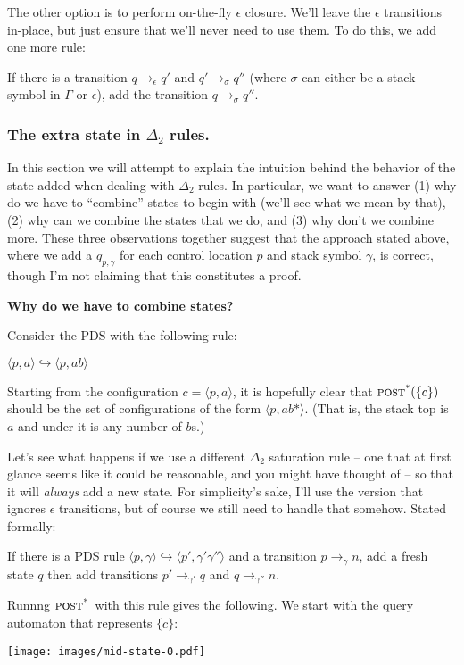 \documentclass{article}
\newcommand{\Config}[2]{\ensuremath{\langle #1, #2 \rangle}}
\newcommand{\Rule}[2]{\ensuremath{#1 \hookrightarrow #2}}
\newcommand{\Trans}[3]{\ensuremath{#1 \rightarrow_{#2} #3}}
\newcommand{\subsubsubsection}[1]{\textbf{#1}}
\newcommand{\poststar}{\ensuremath{\textsc{post}^\textsc{*}}}
\begin{document}
The other option is to perform on-the-fly $\epsilon$ closure. We'll
leave the $\epsilon$ transitions in-place, but just ensure that we'll
never need to use them. To do this, we add one more rule:

    If there is a transition \Trans{q}{\epsilon}{q'} and
    \Trans{q'}{\sigma}{q''} (where $\sigma$ can either be a stack
    symbol in $\Gamma$ or $\epsilon$), add the transition
    \Trans{q}{\sigma}{q''}.


\subsubsection{The extra state in $\Delta_2$ rules.}

In this section we will attempt to explain the intuition behind the
behavior of the state added when dealing with $\Delta_2$ rules.  In
particular, we want to answer (1) why do we have to ``combine'' states
to begin with (we'll see what we mean by that), (2) why can we combine
the states that we do, and (3) why don't we combine more. These three
observations together suggest that the approach stated above, where we
add a $q_{p,\gamma}$ for each control location $p$ and stack symbol
$\gamma$, is correct, though I'm not claiming that this constitutes a
proof.

\subsubsubsection{Why do we have to combine states?}

Consider the PDS with the following rule:

  \Rule{\Config{p}{a}}{\Config{p}{ab}}

Starting from the configuration $c = \Config{p}{a}$, it is hopefully
clear that $\poststar(\{c\})$ should be the set of configurations of
the form \Config{p}{ab*}. (That is, the stack top is $a$ and under it
is any number of $b$s.)

Let's see what happens if we use a different $\Delta_2$ saturation
rule -- one that at first glance seems like it could be reasonable,
and you might have thought of -- so that it will \emph{always} add a
new state. For simplicity's sake, I'll use the version that ignores
$\epsilon$ transitions, but of course we still need to handle that
somehow. Stated formally:

   If there is a PDS rule
   \Rule{\Config{p}{\gamma}}{\Config{p'}{\gamma'\gamma''}} and a
   transition \Trans{p}{\gamma}{n}, add a fresh state $q$ then add
   transitions \Trans{p'}{\gamma'}{q} and \Trans{q}{\gamma''}{n}.

Runnng \poststar\ with this rule gives the following. We start with the
query automaton that represents $\{c\}$:
\begin{center}
  \texttt{[image: images/mid-state-0.pdf]}
\end{center}
\end{document}
